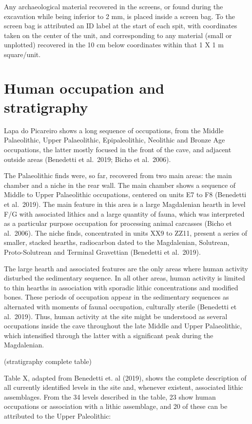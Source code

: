 \documentclass[12pt,twoside]{reedthesis}
\begin{document}
Any archaeological material recovered in the screens, or found during the excavation while being inferior to 2 mm, is placed inside a screen bag. To the screen bag is attributed an ID label at the start of each spit, with coordinates taken on the center of the unit, and corresponding to any material (small or unplotted) recovered in the 10 cm below coordinates within that 1 X 1 m square/unit.

\hypertarget{human-occupation-and-stratigraphy}{%
\section{Human occupation and stratigraphy}\label{human-occupation-and-stratigraphy}}

Lapa do Picareiro shows a long sequence of occupations, from the Middle Palaeolithic, Upper Palaeolithic, Epipaleolithic, Neolithic and Bronze Age occupations, the latter mostly focused in the front of the cave, and adjacent outside areas (Benedetti et al.~2019; Bicho et al.~2006).

The Palaeolithic finds were, so far, recovered from two main areas: the main chamber and a niche in the rear wall. The main chamber shows a sequence of Middle to Upper Palaeolithic occupations, centered on units E7 to F8 (Benedetti et al.~2019). The main feature in this area is a large Magdalenian hearth in level F/G with associated lithics and a large quantity of fauna, which was interpreted as a particular purpose occupation for processing animal carcasses (Bicho et al.~2006). The niche finds, concentrated in units XX9 to ZZ11, present a series of smaller, stacked hearths, radiocarbon dated to the Magdalenian, Solutrean, Proto-Solutrean and Terminal Gravettian (Benedetti et al.~2019).

The large hearth and associated features are the only areas where human activity disturbed the sedimentary sequence. In all other areas, human activity is limited to thin hearths in association with sporadic lithic concentrations and modified bones. These periods of occupation appear in the sedimentary sequences as alternated with moments of faunal occupation, culturally sterile (Benedetti et al.~2019). Thus, human activity at the site might be understood as several occupations inside the cave throughout the late Middle and Upper Palaeolithic, which intensified through the latter with a significant peak during the Magdalenian.

(stratigraphy complete table)

Table X, adapted from Benedetti et. al (2019), shows the complete description of all currently identified levels in the site and, whenever existent, associated lithic assemblages. From the 34 levels described in the table, 23 show human occupations or association with a lithic assemblage, and 20 of these can be attributed to the Upper Paleolithic:
\end{document}
